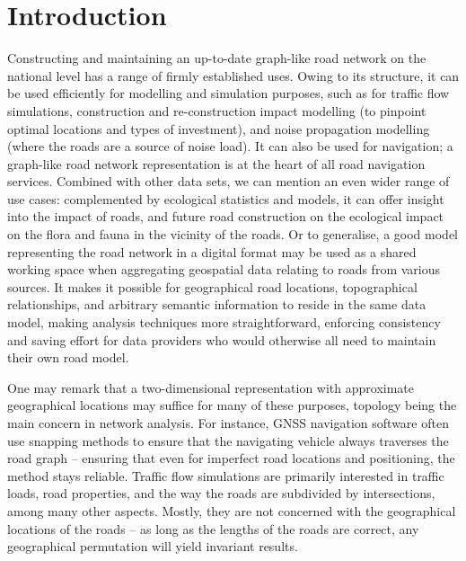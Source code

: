 
\chapter{Introduction}
\label{chap:i}

Constructing and maintaining an up-to-date graph-like road network on the national level has a range of firmly established uses. Owing to its structure, it can be used efficiently for modelling and simulation purposes, such as for traffic flow simulations, construction and re-construction impact modelling (to pinpoint optimal locations and types of investment), and noise propagation modelling (where the roads are a source of noise load). It can also be used for navigation; a graph-like road network representation is at the heart of all road navigation services. Combined with other data sets, we can mention an even wider range of use cases: complemented by ecological statistics and models, it can offer insight into the impact of roads, and future road construction on the ecological impact on the flora and fauna in the vicinity of the roads. Or to generalise, a good model representing the road network in a digital format may be used as a shared working space when aggregating geospatial data relating to roads from various sources. It makes it possible for geographical road locations, topographical relationships, and arbitrary semantic information to reside in the same data model, making analysis techniques more straightforward, enforcing consistency and saving effort for data providers who would otherwise all need to maintain their own road model.

One may remark that a two-dimensional representation with approximate geographical locations may suffice for many of these purposes, topology being the main concern in network analysis. For instance, GNSS navigation software often use snapping methods to ensure that the navigating vehicle always traverses the road graph – ensuring that even for imperfect road locations and positioning, the method stays reliable. Traffic flow simulations are primarily interested in traffic loads, road properties, and the way the roads are subdivided by intersections, among many other aspects. Mostly, they are not concerned with the geographical locations of the roads – as long as the lengths of the roads are correct, any geographical permutation will yield invariant results.

